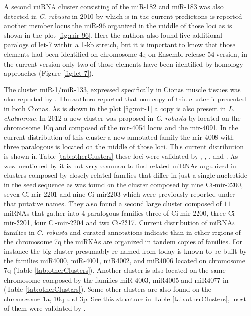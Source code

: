 \documentclass[graybox]{svmult}
\newcommand{\TODO}[1]{\begingroup\color{red}#1\endgroup}
\begin{document}
A second miRNA cluster consisting of the miR-182 and miR-183 was also detected 
in \textit{C. robusta} in 2010 by \cite{Keshavan2010} \TODO{which is in the 
current predictions is reported another member} locus the miR-96 organized in 
the middle of those loci as is shown in the plot \ref{fig:mir-96}. 
Here the authors also found five additional paralogs of let-7 within a 1-kb 
stretch, but it is important to know that those elements had been identified on 
chromosome 4q on Ensembl release 54 version, in the current version only 
two of those elements have been identified by homology approaches (Figure 
\ref{fig:let-7}).

The cluster miR-1/miR-133, expressed specifically in Cionas muscle tissues was 
also reported by \cite{Kusakabe2013}. The authors reported that one copy of 
this cluster is presented in both Cionas. As is shown in the plot 
\ref{fig:mir-1} a copy is also present in \textit{L. chalumnae}. In 2012 a 
new cluster was proposed in \textit{C. robusta} by \cite{Terai2012} located 
on the chromosome 10q and composed of the mir-4054 locus and the mir-4091. In 
the current distribution of this cluster a new annotated family the mir-4008 
with three paralogous is located on the middle of those loci. This current 
distribution is shown in Table \ref{tab:otherClusters} these loci were  
validated by \cite{Norden-Krichmar2007}, \cite{Fu:08}, \cite{Hendrix2010}, and 
\cite{Terai2012}. As was mentioned by \cite{Hendrix2010} it is not very 
common to find related miRNAs organized in clusters composed by closely related 
families that differ in just a single nucleotide in the seed sequence as was 
found on the cluster composed by nine Ci-mir-2200, seven Ci-mir-2201 and nine 
Ci-mir2203 which were previously reported under that putative names. 
\TODO{They} also found a second large cluster composed of $11$ miRNAs that 
gather into $4$ paralogous families three of Ci-mir-2200, three Ci-mir-2201, 
four Ci-mir-2204 and two Ci-2217. Current distribution of miRNAs families in 
\textit{C. robusta} and curated annotations indicate than in other regions of 
the chromosome 7q the miRNAs are organized in tandem copies of families. For 
instance \TODO{the big cluster presumably re-named from \cite{Hendrix2010} 
today} is known to be built by the families miR4000, miR-4001, miR4002, and 
miR4006 located on chromosome 7q (Table \ref{tab:otherClusters}). Another 
cluster is also located on the same chromosome composed by the families 
miR-4003, miR4005 and miR4077 in (Table \ref{tab:otherClusters}). Some other 
clusters are also found on the chromosome 1a, 10q and 3p. See this structure in 
Table \ref{tab:otherClusters}, most of them were validated 
by \cite{Hendrix2010}. 
\end{document}
